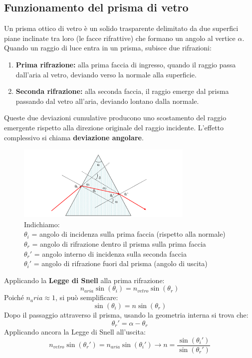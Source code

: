\subsection{Funzionamento del prisma di vetro}
Un prisma ottico di vetro è un solido trasparente delimitato da due superfici piane inclinate tra loro (le facce rifrattive) che formano un angolo al vertice $\alpha$. Quando un raggio di luce entra in un prisma, subisce due rifrazioni:

\begin{enumerate}
	\item \textbf{Prima rifrazione:} alla prima faccia di ingresso, quando il raggio passa dall'aria al vetro, deviando verso la normale alla superficie.
	\item \textbf{Seconda rifrazione:} alla seconda faccia, il raggio emerge dal prisma passando dal vetro all'aria, deviando lontano dalla normale.
\end{enumerate}

Queste due deviazioni cumulative producono uno scostamento del raggio emergente rispetto alla direzione originale del raggio incidente. L'effetto complessivo si chiama \textbf{deviazione angolare}.

\begin{figure}[H]
	\centering
	\includegraphics[width=0.75\textwidth]{./figures/prismateoria}
	\caption{Indichiamo: \\
		$\theta_i$ = angolo di incidenza sulla prima faccia (rispetto alla normale) \\
		$\theta_r$ = angolo di rifrazione dentro il prisma sulla prima faccia \\
		$\theta_r'$ = angolo interno di incidenza sulla seconda faccia \\
		$\theta_i'$ = angolo di rifrazione fuori dal prisma (angolo di uscita)}
\end{figure}

Applicando la \textbf{Legge di Snell} alla prima rifrazione:
\begin{equation}
	n_{aria}\sin(\theta_i)=n_{vetro}\sin(\theta_r)
\end{equation}
Poiché $n_aria \approx 1$, si può semplificare:
\begin{equation}
	\sin(\theta_i)=n\sin(\theta_r)
\end{equation}
Dopo il passaggio attraverso il prisma, usando la geometria interna si trova che:
\begin{equation}
	\theta_r'=\alpha-\theta_r
\end{equation}
Applicando ancora la Legge di Snell all'uscita:
\begin{equation}
	n_{vetro}\sin(\theta_r')=n_{aria}\sin(\theta_i') \rightarrow n=\frac{\sin(\theta_i')}{\sin(\theta_r')}
\end{equation}

